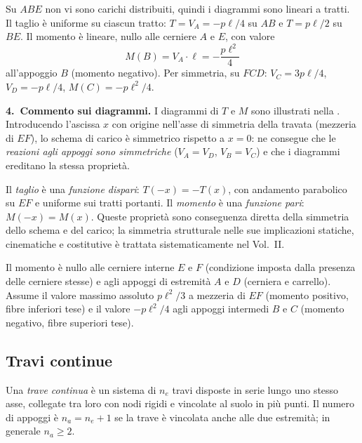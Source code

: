 Su $ABE$ non vi sono carichi distribuiti, quindi i diagrammi sono
lineari a tratti. Il taglio è uniforme su ciascun tratto:
$T = V_A = -p\ell/4$ su $AB$ e $T = p\ell/2$ su $BE$.
Il momento è lineare, nullo alle cerniere $A$ e $E$, con valore
\[
M(B) = V_A \cdot \ell = -\frac{p\ell^2}{4}
\]
all'appoggio $B$ (momento negativo).
Per simmetria, su $FCD$: $V_C = 3p\ell/4$, $V_D = -p\ell/4$,
$M(C) = -p\ell^2/4$.

\medskip
\noindent\textbf{4.~Commento sui diagrammi.}
I diagrammi di $T$ e $M$ sono illustrati nella
.
Introducendo l'ascissa $x$ con origine nell'asse di simmetria
della travata (mezzeria di $EF$), lo schema di carico è
simmetrico rispetto a $x = 0$: ne consegue che le
\emph{reazioni agli appoggi sono simmetriche}
($V_A = V_D$, $V_B = V_C$) e che i diagrammi ereditano
la stessa proprietà.

Il \emph{taglio} è una \emph{funzione dispari}:
$T(-x) = -T(x)$, con andamento parabolico su $EF$
e uniforme sui tratti portanti.
Il \emph{momento} è una \emph{funzione pari}:
$M(-x) = M(x)$.
Queste proprietà sono conseguenza diretta della simmetria
dello schema e del carico; la simmetria strutturale nelle
sue implicazioni statiche, cinematiche e costitutive è
trattata sistematicamente nel Vol.~II.

Il momento è nullo alle cerniere interne $E$ e $F$
(condizione imposta dalla presenza delle cerniere stesse)
e agli appoggi di estremità $A$ e $D$ (cerniera e carrello).
Assume il valore massimo assoluto $p\ell^2/3$ a mezzeria
di $EF$ (momento positivo, fibre inferiori tese) e il
valore $-p\ell^2/4$ agli appoggi intermedi $B$ e $C$
(momento negativo, fibre superiori tese).


\subsection{Travi continue}
\label{subsec:travi_continue}

Una \emph{trave continua} è un sistema di $n_e$ travi
disposte in serie lungo uno stesso asse, collegate tra
loro con nodi rigidi e vincolate al suolo in più punti.
Il numero di appoggi è $n_a = n_e + 1$ se la trave è
vincolata anche alle due estremità; in generale
$n_a \geq 2$.

